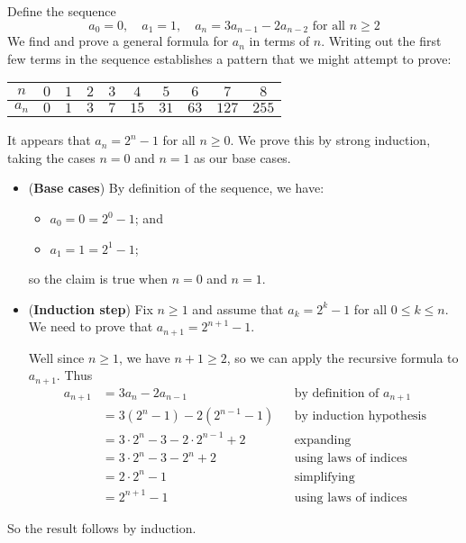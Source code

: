 \begin{example}
Define the sequence
\[ a_0 = 0, \quad a_1 = 1, \quad a_n = 3a_{n-1} - 2a_{n-2} \text{ for all } n \ge 2 \]
We find and prove a general formula for $a_n$ in terms of $n$. Writing out the first few terms in the sequence establishes a pattern that we might attempt to prove:
\begin{center}
\begin{tabular}{c|ccccccccc}
$n$   & $0$ & $1$ & $2$ & $3$ & $4$  & $5$  & $6$  & $7$   & $8$ \\ \hline
$a_n$ & $0$ & $1$ & $3$ & $7$ & $15$ & $31$ & $63$ & $127$ & $255$
\end{tabular}
\end{center}

It appears that $a_n = 2^n - 1$ for all $n \ge 0$. We prove this by strong induction, taking the cases $n=0$ and $n=1$ as our base cases.

\begin{itemize}
\item (\textbf{Base cases}) By definition of the sequence, we have:
\begin{itemize}
\item $a_0 = 0 = 2^0 - 1$; and
\item $a_1 = 1 = 2^1 - 1$;
\end{itemize}
so the claim is true when $n=0$ and $n=1$.

\item (\textbf{Induction step}) Fix $n \ge 1$ and assume that $a_k = 2^k - 1$ for all $0 \le k \le n$. We need to prove that $a_{n+1} = 2^{n+1} - 1$.

Well since $n \ge 1$, we have $n+1 \ge 2$, so we can apply the recursive formula to $a_{n+1}$. Thus
\begin{align*}
a_{n+1} &= 3a_n - 2a_{n-1} && \text{by definition of $a_{n+1}$} \\
&= 3(2^n-1) - 2(2^{n-1}-1) && \text{by induction hypothesis} \\
&= 3 \cdot 2^n - 3 - 2 \cdot 2^{n-1} + 2 && \text{expanding} \\
&= 3 \cdot 2^n - 3 - 2^n + 2 && \text{using laws of indices} \\
&= 2 \cdot 2^n - 1 && \text{simplifying} \\
&= 2^{n+1} - 1 && \text{using laws of indices}
\end{align*}
\end{itemize}
So the result follows by induction.
\end{example}

